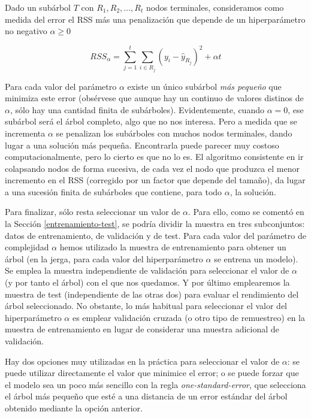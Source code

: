 \documentclass[
]{book}
\theoremstyle{break}
\theoremstyle{nonumberplain}
\begin{document}
Dado un subárbol \(T\) con \(R_1, R_2, \ldots, R_t\) nodos terminales, consideramos como
medida del error el RSS más una penalización que depende de un hiperparámetro
no negativo \(\alpha \ge 0\)

\begin{equation} 
RSS_{\alpha} = \sum_{j=1}^t \sum_{i\in R_j} (y_i - \widehat y_{R_j})^2 + \alpha t
\label{eq:rss-alpha}
\end{equation}

Para cada valor del parámetro \(\alpha\) existe un único subárbol \emph{más pequeño}
que minimiza este error (obsérvese que aunque hay un continuo de valores
distinos de \(\alpha\), sólo hay una cantidad finita de subárboles).
Evidentemente, cuando \(\alpha = 0\), ese subárbol será el árbol completo, algo que
no nos interesa. Pero a medida que se incrementa \(\alpha\) se penalizan los subárboles
con muchos nodos terminales, dando lugar a una solución más pequeña.
Encontrarla puede parecer muy costoso computacionalmente, pero lo
cierto es que no lo es. El algoritmo consistente en ir colapsando nodos de forma
sucesiva, de cada vez el nodo que produzca el menor incremento en el RSS (corregido por
un factor que depende del tamaño), da
lugar a una sucesión finita de subárboles que contiene, para todo \(\alpha\), la
solución.

Para finalizar, sólo resta seleccionar un valor de \(\alpha\).
Para ello, como se comentó en la Sección \ref{entrenamiento-test}, se podría dividir la muestra en tres subconjuntos: datos de entrenamiento, de validación y de test.
Para cada valor del parámetro de complejidad \(\alpha\) hemos utilizado la muestra de entrenamiento para obtener un árbol
(en la jerga, para cada valor del hiperparámetro \(\alpha\) se entrena un modelo).
Se emplea la muestra independiente de validación para seleccionar el valor de \(\alpha\) (y por tanto el árbol) con el que nos quedamos.
Y por último emplearemos la muestra de test (independiente de las otras dos) para evaluar el rendimiento del árbol seleccionado.
No obstante, lo más habitual para seleccionar el valor del hiperparámetro \(\alpha\) es emplear validación cruzada (o otro tipo de remuestreo) en la muestra de entrenamiento en lugar de considerar una muestra adicional de validación.

Hay dos opciones muy utilizadas en la práctica para seleccionar el valor de \(\alpha\):
se puede utilizar directamente el valor que minimice el error; o se puede forzar
que el modelo sea un poco más sencillo con la regla \emph{one-standard-error}, que selecciona
el árbol más pequeño que esté a una distancia de un error estándar del árbol obtenido
mediante la opción anterior.
\end{document}
